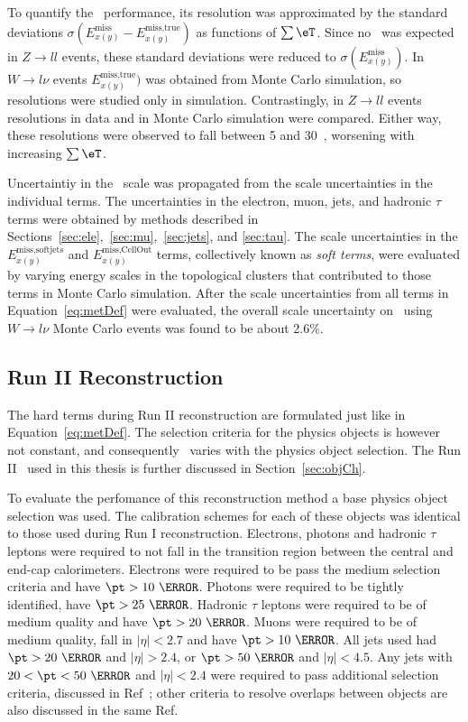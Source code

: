 \par To quantify the \met\ 
performance, its resolution was approximated by the standard deviations 
$\sigma(E^{\text{miss}}_{x(y)} - E^{\text{miss,true}}_{x(y)})$ as functions of $\sum \eT$. 
Since no \met\ was expected in $Z\to ll$ events, these standard deviations were reduced 
to $\sigma(E^{\text{miss}}_{x(y)})$. In $W\to l\nu$ events $E^{\text{miss,true}}_{x(y)})$ 
was obtained from Monte Carlo simulation, so resolutions were studied only in simulation. Contrastingly, in $Z\to ll$ 
events resolutions in data and in Monte Carlo simulation were compared. Either way, these resolutions were observed 
to fall between 5 and 30~\GeV, worsening with increasing $\sum \eT$.

\par Uncertaintiy in the \met\ scale was propagated from the scale uncertainties in the 
individual terms. The uncertainties in the electron, muon, jets, and hadronic $\tau$ terms 
were obtained by methods described in Sections~\ref{sec:ele},~\ref{sec:mu},~\ref{sec:jets}, and 
\ref{sec:tau}. The scale uncertainties in the $E^{\text{miss,softjets}}_{x(y)}$ and $E^{\text{miss,CellOut}}_{x(y)}$ 
terms, collectively known as {\it soft terms}, were evaluated by varying energy 
scales in the topological clusters that contributed to those terms in Monte Carlo 
simulation. After the scale uncertainties from all terms in Equation~\ref{eq:metDef} were evaluated, 
the overall scale uncertainty on \met\ using $W\to l\nu$ Monte Carlo events was found to be 
about 2.6\%. 

\subsection{Run II Reconstruction}
\label{sec:runIImet}
\par The hard terms during Run II reconstruction are formulated just like in Equation~\ref{eq:metDef}.
The selection criteria for the physics objects is however not constant, and consequently \met\ varies 
with the physics object selection. The Run II \met\ used in this thesis is further discussed in 
Section~\ref{sec:objCh}.  

\par To evaluate the perfomance of this reconstruction method a base physics object selection was used. 
The calibration schemes for each of these objects was identical to those used during Run I reconstruction.
Electrons, photons and hadronic $\tau$ leptons were required to not fall in the 
transition region between the central and end-cap calorimeters. 
Electrons were required to be pass the medium selection criteria and have $\pt>10~\GeV$. 
Photons were required to be tightly identified, have $\pt>25~\GeV$. Hadronic $\tau$ leptons 
were required to be of medium quality and have $\pt>20~\GeV$. Muons were required to be of medium 
quality, fall in $|\eta|<2.7$ and have $\pt>10~\GeV$. All jets used had $\pt>20~\GeV$ and $|\eta|>2.4$, or 
$\pt>50~\GeV$ and $|\eta|<4.5$. Any jets with $20<\pt<50~\GeV$ and $|\eta|<2.4$ were required to pass 
additional selection criteria, discussed in Ref~\cite{Brunt:2149445}; other criteria to 
resolve overlaps between objects are also discussed in the same Ref.  

